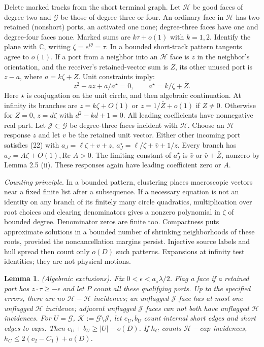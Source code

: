 \documentclass[10pt,reqno]{amsart}
\newtheorem{lemma}{Lemma}[section]
\begin{document}
Delete marked tracks from the short terminal graph. Let $\mathcal{H}$ be good faces of degree two and $\mathcal{G}$ be those of degree three or four. An ordinary face in $\mathcal{H}$ has two retained (nonshort) ports, an activated one none; degree-three faces have one and degree-four faces none. Marked sums are $k \tau + o(1)$ with $k = 1, 2$. Identify the plane with $\mathbb{C}$, writing $\zeta = e^{i \theta} = \tau$. In a bounded short-track pattern tangents agree to $o(1)$. If a port from a neighbor into an $\mathcal{H}$ face is $z$ in the neighbor's orientation, and the receiver's retained-vector sum is $Z$, its other unused port is $z - a$, where $a = k \zeta + Z$. Unit constraints imply:
\begin{equation}
    z^2 - az + a / a^\star = 0, \qquad a^\star = k / \zeta + \bar{Z}.
\end{equation}
Here $\star$ is conjugation on the unit circle, and then algebraic continuation. At infinity its branches are $z = k \zeta + O(1)$ or $z = 1 / \bar{Z} + o(1)$ if $Z \ne 0$. Otherwise for $Z = 0$, $z = d \zeta$ with $d^2 - kd + 1 = 0$. All leading coefficients have nonnegative real part. Let $\mathcal{J} \subset \mathcal{G}$ be degree-three faces incident with $\mathcal{H}$. Choose an $\mathcal{H}$ response $z$ and let $v$ be the retained unit vector. Either other incoming port satisfies (22) with $a_J = \ell \zeta + v + z$, $a_J^\star = \ell / \zeta + \bar{v} + 1 / z$. Every branch has $a_J = A \zeta + O(1), \text{Re }A > 0$. The limiting constant of $a_J^\star$ is $\bar{v}$ or $\bar{v} + \bar{Z}$, nonzero by Lemma 2.5 (ii). These responses again have leading coefficient zero or $A$.

\textit{Counting principle}. In a bounded pattern, clustering places macroscopic vectors near a fixed finite list after a subsequence. If a necessary equation is not an identity on any branch of its finitely many circle quadratics, multiplication over root choices and clearing denominators gives a nonzero polynomial in $\zeta$ of bounded degree. Denominator zeros are finite too. Compactness puts approximate solutions in a bounded number of shrinking neighborhoods of these roots, provided the noncancellation margins persist. Injective source labels and hull spread then count only $o(D)$ such patterns. Expansions at infinity test identities; they are not physical motions.

\begin{lemma}
    (Algebraic exclusions). Fix $0 < \epsilon < a_\star \lambda / 2$. Flag a face if a retained port has $z \cdot \tau \ge - \epsilon$ and let $P$ count all these qualifying ports. Up to the specified errors, there are no $\mathcal{H}-\mathcal{H}$ incidences; an unflagged $\mathcal{J}$ face has at most one unflagged $\mathcal{H}$ incidence; adjacent unflagged $\mathcal{J}$ faces can not both have unflagged $\mathcal{H}$ incidences. For $U = \mathcal{G}$, $\mathcal{K} := \mathcal{G} \setminus \mathcal{J}$, let $e_U, b_U$ count internal short edges and short edges to caps. Then $e_U + b_U \ge |U| - o(D)$. If $h_C$ counts $\mathcal{H}-cap$ incidences, $h_C \le 2 (c_2 - C_1) + o(D)$.
\end{lemma}
\end{document}
